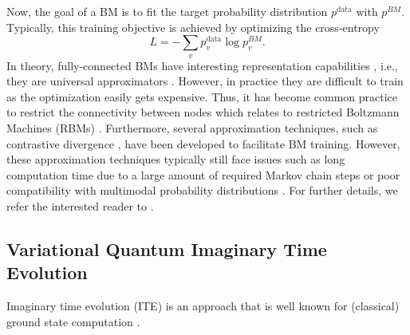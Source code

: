 \documentclass[twocolumn, aps, pra, superscriptaddress, floatfix]{revtex4}
\begin{document}
Now, the goal of a BM is to fit the target probability distribution $p^{\text{data}}$ with $p^{BM}$.
Typically, this training objective is achieved by optimizing the cross-entropy
\begin{equation}
\label{eq:crossEnt}
	L = -\sum\limits_{v}p_v^{\text{data}}\log{p_v^{BM}}.
\end{equation}
In theory, fully-connected BMs have interesting representation capabilities \cite{HintonBM1985, YOUNES1996109, Fischer12RBM}, i.e., they are universal approximators \cite{Roux10}. 
However, in practice they are difficult to train as the optimization easily gets expensive. 
Thus, it has become common practice to restrict the connectivity between nodes which relates to restricted Boltzmann Machines (RBMs) \cite{RBM_Montufar_2018}. 
Furthermore, several approximation techniques, such as contrastive divergence \cite{Hinton2002TrainingPO}, have been developed to facilitate BM training. 
However, these approximation techniques typically still face issues such as long computation time due to a large amount of required Markov chain steps or poor compatibility with multimodal probability distributions \cite{MurphyML12}.
For further details, we refer the interested reader to \cite{Hinton2012, Fischer2012, Fischer2015}.

\subsection{Variational Quantum Imaginary Time Evolution}
\label{sec:VarQITE}

Imaginary time evolution (ITE) \cite{MagnusITE54} is an approach that is well known for (classical) ground state computation \cite{VarSITEMcArdle19, GuptaITE02, ITEAuer01}. 
\end{document}
